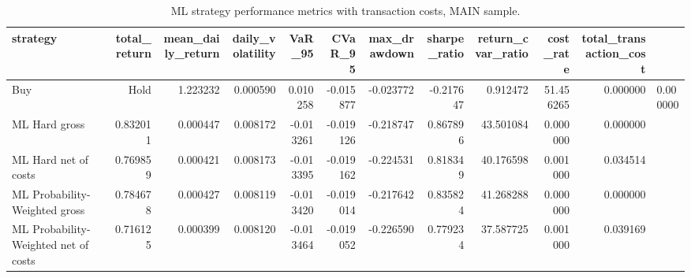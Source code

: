 \begin{table}
\caption{ML strategy performance metrics with transaction costs, MAIN sample.}
\label{tab:ml_performance_metrics_with_costs_main}
\begin{tabular}{lrrrrrrrrrr}
\toprule
strategy & total_return & mean_daily_return & daily_volatility & VaR_95 & CVaR_95 & max_drawdown & sharpe_ratio & return_cvar_ratio & cost_rate & total_transaction_cost \\
\midrule
Buy & Hold & 1.223232 & 0.000590 & 0.010258 & -0.015877 & -0.023772 & -0.217647 & 0.912472 & 51.456265 & 0.000000 & 0.000000 \\
ML Hard gross & 0.832011 & 0.000447 & 0.008172 & -0.013261 & -0.019126 & -0.218747 & 0.867896 & 43.501084 & 0.000000 & 0.000000 \\
ML Hard net of costs & 0.769859 & 0.000421 & 0.008173 & -0.013395 & -0.019162 & -0.224531 & 0.818349 & 40.176598 & 0.001000 & 0.034514 \\
ML Probability-Weighted gross & 0.784678 & 0.000427 & 0.008119 & -0.013420 & -0.019014 & -0.217642 & 0.835824 & 41.268288 & 0.000000 & 0.000000 \\
ML Probability-Weighted net of costs & 0.716125 & 0.000399 & 0.008120 & -0.013464 & -0.019052 & -0.226590 & 0.779234 & 37.587725 & 0.001000 & 0.039169 \\
\bottomrule
\end{tabular}
\end{table}
